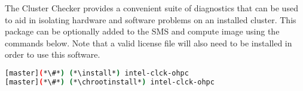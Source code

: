 The \Intel{} Cluster Checker provides a convenient suite of diagnostics that
can be used to aid in isolating hardware and software problems on an installed
cluster. This package can be optionally added to the SMS and compute image
using the commands below. Note that a valid license file will also need to be
installed in order to use this software.

\begin{lstlisting}[language=bash,keywords={}]
[master](*\#*) (*\install*) intel-clck-ohpc
[master](*\#*) (*\chrootinstall*) intel-clck-ohpc
\end{lstlisting}
